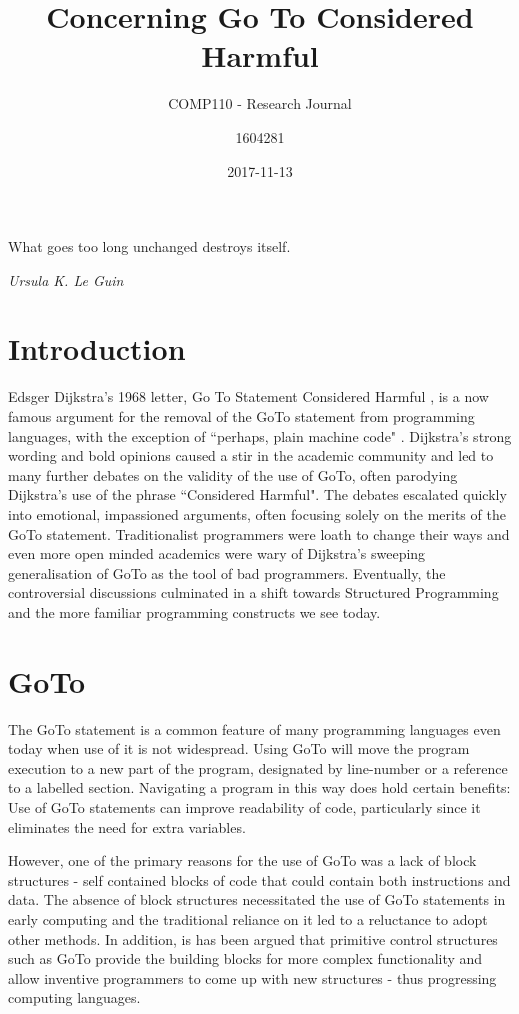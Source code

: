 \documentclass{scrartcl}
\title{Concerning Go To Considered Harmful}
\subtitle{COMP110 - Research Journal}
\date{2017-11-13}
\author{1604281}
\begin{document}
\maketitle
{}

\epigraph{What goes too long unchanged destroys itself.}{\textit{Ursula K. Le Guin}}

\section{Introduction}

Edsger Dijkstra's 1968 letter, Go To Statement Considered Harmful \cite{dijkstragoto}, is a now famous argument for the removal of the GoTo statement from programming languages, with the exception of ``perhaps, plain machine code" \cite[p. ~147]{dijkstragoto}. Dijkstra's strong wording and bold opinions caused a stir in the academic community and led to many further debates on the validity of the use of GoTo, often parodying Dijkstra's use of the phrase ``Considered Harmful". The debates escalated quickly into emotional, impassioned arguments, often focusing solely on the merits of the GoTo statement. Traditionalist programmers were loath to change their ways and even more open minded academics were wary of Dijkstra's sweeping generalisation of GoTo as the tool of bad programmers. Eventually, the controversial discussions culminated in a shift towards Structured Programming and the more familiar programming constructs we see today.

\section{GoTo}

The GoTo statement is a common feature of many programming languages even today when use of it is not widespread. Using GoTo will move the program execution to a new part of the program, designated by line-number or a reference to a labelled section. Navigating a program in this way does hold certain benefits: Use of GoTo statements can improve readability of code, particularly since it eliminates the need for extra variables. \cite{casefor} 


However, one of the primary reasons for the use of GoTo was a lack of block structures - self contained blocks of code that could contain both instructions and data. The absence of block structures necessitated the use of GoTo statements in early computing and the traditional reliance on it led to a reluctance to adopt other methods. In addition, is has been argued that primitive control structures such as GoTo provide the building blocks for more complex functionality and allow inventive programmers to come up with new structures - thus progressing computing languages. \cite{casefor}
\end{document}
